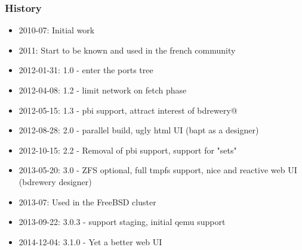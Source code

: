 \begin{frame}
	\frametitle{History}
	\begin{itemize}
		\item 2010-07: Initial work
		\item 2011: Start to be known and used in the french community
		\item 2012-01-31: 1.0 - enter the ports tree
		\item 2012-04-08: 1.2 - limit network on fetch phase
		\item 2012-05-15: 1.3 - pbi support, attract interest of bdrewery@
		\item 2012-08-28: 2.0 - parallel build, ugly html UI (bapt as a designer)
		\item 2012-10-15: 2.2 - Removal of pbi support, support for "sets"
		\item 2013-05-20: 3.0 - ZFS optional, full tmpfs support, nice and reactive web UI (bdrewery designer)
		\item 2013-07: Used in the FreeBSD cluster
		\item 2013-09-22: 3.0.3 - support staging, initial qemu support
		\item 2014-12-04: 3.1.0 - Yet a better web UI
	\end{itemize}
\end{frame}

